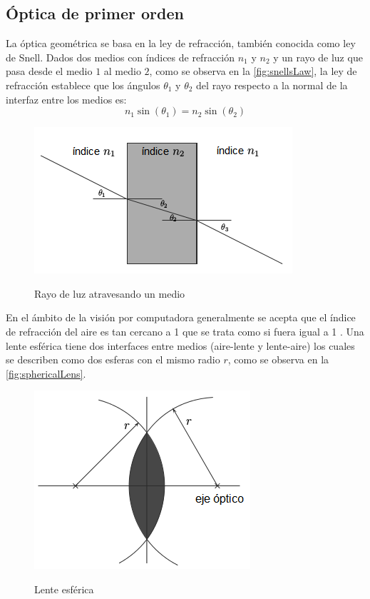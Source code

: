 \subsection{Óptica de primer orden}
La óptica geométrica se basa en la ley de refracción, también conocida como ley de Snell. Dados dos medios con índices de refracción $n_1$ y $n_2$ y un rayo de luz que pasa desde el medio $1$ al medio $2$, como se observa en la \autoref{fig:snellsLaw}, la ley de refracción establece que los ángulos $\theta_1$ y $\theta_2$ del rayo respecto a la normal de la interfaz entre los medios es:
\begin{equation*}
	n_1 \sin(\theta_1) = n_2 \sin(\theta_2)
\end{equation*}
\begin{figure}[bth]
    \centering
        {\includegraphics[width=.6\linewidth]{images/snellsLaw}}
        \caption{Rayo de luz atravesando un medio}
        \label{fig:snellsLaw}
\end{figure}

En el ámbito de la visión por computadora generalmente se acepta que el índice de refracción del aire es tan cercano a 1 que se trata como si fuera igual a 1 \cite{hanning2011high}. Una lente esférica tiene dos interfaces entre medios (aire-lente y lente-aire) los cuales se describen como dos esferas con el mismo radio $r$, como se observa en la \autoref{fig:sphericalLens}.
\begin{figure}[bth]
    \centering
        {\includegraphics[width=.5\linewidth]{images/sphericalLens}}
        \caption{Lente esférica}
        \label{fig:sphericalLens}
\end{figure}

